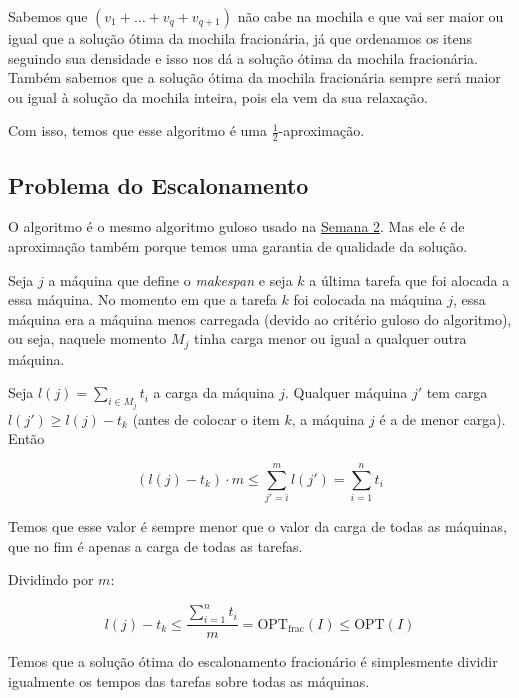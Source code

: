 Sabemos que $(v_1+\dots+v_q+v_{q+1})$ não cabe na mochila e que vai ser maior ou igual que a solução ótima da mochila fracionária, já que ordenamos os itens seguindo sua densidade e isso nos dá a solução ótima da mochila fracionária. Também sabemos que a solução ótima da mochila fracionária sempre será maior ou igual à solução da mochila inteira, pois ela vem da sua relaxação.

Com isso, temos que esse algoritmo é uma $\frac{1}{2}$-aproximação.

\subsection{Problema do Escalonamento}

\begin{algorithm}
	\SetAlgoLined
\end{algorithm}

O algoritmo é o mesmo algoritmo guloso usado na \hyperref[chp:semana2]{Semana 2}. Mas ele é de aproximação também porque temos uma garantia de qualidade da solução.

Seja $j$ a máquina que define o \textit{makespan} e seja $k$ a última tarefa que foi alocada a essa máquina. No momento em que a tarefa $k$ foi colocada na máquina $j$, essa máquina era a máquina menos carregada (devido ao critério guloso do algoritmo), ou seja, naquele momento $M_j$ tinha carga menor ou igual a qualquer outra máquina.

Seja $l(j)=\sum_{i \in M_j}t_i$ a carga da máquina $j$. Qualquer máquina $j'$ tem carga $l(j')\geq l(j)-t_k$ (antes de colocar o item $k$, a máquina $j$ é a de menor carga). Então

\[
	(l(j)-t_k) \cdot m \leq \sum_{j'=i}^ml(j') = \sum_{i=1}^nt_i
\]

Temos que esse valor é sempre menor que o valor da carga de todas as máquinas, que no fim é apenas a carga de todas as tarefas.

Dividindo por $m$:

\[
	l(j)-t_k \leq \frac{\sum_{i=1}^nt_i}{m} = \mathrm{OPT}_{\mathrm{frac}}(I) \leq \mathrm{OPT}(I)
\]

Temos que a solução ótima do escalonamento fracionário é simplesmente dividir igualmente os tempos das tarefas sobre todas as máquinas.

